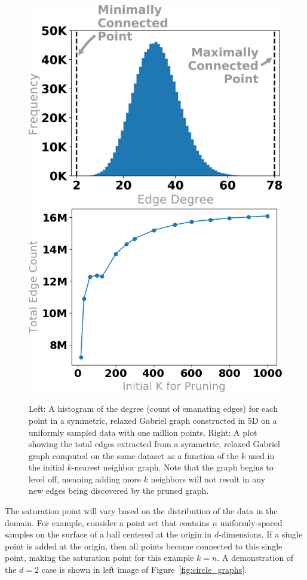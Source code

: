 \begin{figure}[t]
    \centering
      \includegraphics[width=.45\linewidth]{figs/chap7/n-1M_d-5_s-0_k-1000_relaxed_gabriel_histogram.png}
      \includegraphics[width=.45\linewidth]{figs/chap7/saturation_1000000_5D.png}
     \caption[Exploration of edge density on five-dimensional Gabriel graph]{
     Left: A histogram of the degree (count of emanating edges) for each point in a symmetric, relaxed Gabriel graph constructed in 5D on a uniformly sampled data with one million points.
     Right: A plot showing the total edges extracted from a symmetric, relaxed Gabriel graph computed on the same dataset as a function of the $k$ used in the initial $k$-nearest neighbor graph.
     Note that the graph begins to level off, meaning adding more $k$ neighbors will not result in any new edges being discovered by the pruned graph.
     }
    \label{fig:graph_degree}
    \vspace{-4mm}
  \end{figure}

The saturation point will vary based on the distribution of the data in the domain.
%
For example, consider a point set that contains $n$ uniformly-spaced samples
on the surface of a ball centered at the origin in $d$-dimensions.
%
If a single point is added at the origin, then all points become connected to
this single point, making the saturation point for this example $k=n$.
%
A demonstration of the $d=2$ case is shown in left image of Figure~\ref{fig:circle_graphs}.

